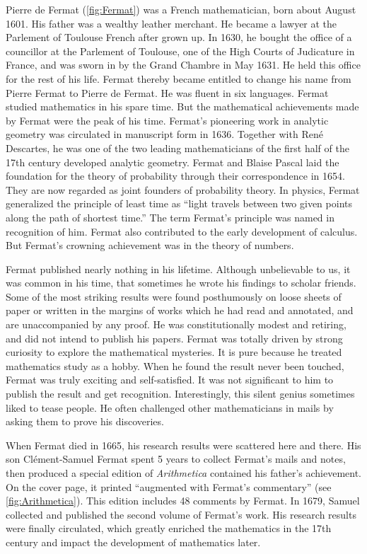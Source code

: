 \documentclass[b5paper]{article}
\begin{document}
\begin{mdframed}
Pierre de Fermat (\cref{fig:Fermat}) was a French mathematician, born about August 1601. His father was a wealthy leather merchant. He became a lawyer at the Parlement of Toulouse French after grown up. In 1630, he bought the office of a councillor at the Parlement of Toulouse, one of the High Courts of Judicature in France, and was sworn in by the Grand Chambre in May 1631. He held this office for the rest of his life. Fermat thereby became entitled to change his name from Pierre Fermat to Pierre de Fermat. He was fluent in six languages. Fermat studied mathematics in his spare time. But the mathematical achievements made by Fermat were the peak of his time. Fermat's pioneering work in analytic geometry was circulated in manuscript form in 1636\footnotemark. Together with René Descartes, he was one of the two leading mathematicians of the first half of the 17th century developed analytic geometry. Fermat and Blaise Pascal laid the foundation for the theory of probability through their correspondence in 1654. They are now regarded as joint founders of probability theory. In physics, Fermat generalized the principle of least time as \enquote{light travels between two given points along the path of shortest time.} The term Fermat's principle was named in recognition of him. Fermat also contributed to the early development of calculus. But Fermat's crowning achievement was in the theory of numbers.

Fermat published nearly nothing in his lifetime. Although unbelievable to us, it was common in his time, that sometimes he wrote his findings to scholar friends. Some of the most striking results were found posthumously on loose sheets of paper or written in the margins of works which he had read and annotated, and are unaccompanied by any proof. He was constitutionally modest and retiring, and did not intend to publish his papers. Fermat was totally driven by strong curiosity to explore the mathematical mysteries. It is pure because he treated mathematics study as a hobby. When he found the result never been touched, Fermat was truly exciting and self-satisfied. It was not significant to him to publish the result and get recognition\cite{HanXueTao2009}. Interestingly, this silent genius sometimes liked to tease people. He often challenged other mathematicians in mails by asking them to prove his discoveries.

When Fermat died in 1665, his research results were scattered here and there. His son Clément-Samuel Fermat spent 5 years to collect Fermat's mails and notes, then produced a special edition of {\em Arithmetica} contained his father's achievement. On the cover page, it printed \enquote{augmented with Fermat's commentary} (see \cref{fig:Arithmetica}). This edition includes 48 comments by Fermat. In 1679, Samuel collected and published the second volume of Fermat's work. His research results were finally circulated, which greatly enriched the mathematics in the 17th century and impact the development of mathematics later.


\end{mdframed}
\end{document}
